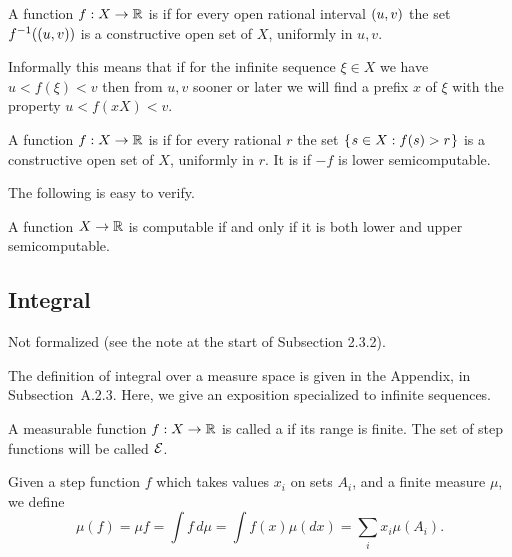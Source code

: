 \begin{definition}
  \label{def:g2.3.22}
  \notready
  A function \( f:X\to\mathbb{R} \) is  if for every open rational interval
\( (u,v) \) the set \( f^{-1}((u,v)) \) is a constructive open set of
\( X \), uniformly in \( u,v \).
\end{definition}

Informally this means that if for the infinite sequence \( \xi\in X \) we have
\( u<f(\xi)<v \) then from \( u,v \) sooner or later we will find a prefix \( x \)
of \( \xi \) with the property \( u<f(xX)<v \).

\begin{definition}
  \label{def:g2.3.23}
  \notready
A function \( f:X\to\mathbb{R} \) is 
if for every rational \( r \) the set \( \mathopen\{\mskip 1mu s\in X: f(s)>r\mskip 1mu\mathclose\} \)
is a constructive open set of \( X \), uniformly in \( r \).
It is  if \( -f \) is lower semicomputable.
\end{definition}

The following is easy to verify.

\begin{proposition}
  \label{prop:g2.3.24}
  \notready
  A function \( X\to\mathbb{R} \) is computable if and only if it is both lower and upper
  semicomputable.
\end{proposition}

\subsection{Integral}

\begin{formalization}
Not formalized (see the note at the start of Subsection 2.3.2).
\end{formalization}

The definition of integral over a measure space is given in the
Appendix, in Subsection~A.2.3.
Here, we give an exposition specialized to infinite sequences.

 \begin{definition}
  \label{def:g2.3.25}
  \notready
A measurable function \( f : X \to \mathbb{R} \) is called a  if
its range is finite.
The set of step functions will be called \( \mathcal{E} \).

Given a step function \( f \) which takes values \( x_{i} \) on sets \( A_{i} \), and a
finite measure \( \mu \), we define
 \[
 \mu(f) = \mu f = \int f\,d\mu = \int f(x) \mu(d x)
   = \sum_{i} x_{i} \mu(A_{i}).
 \]
 \end{definition}

